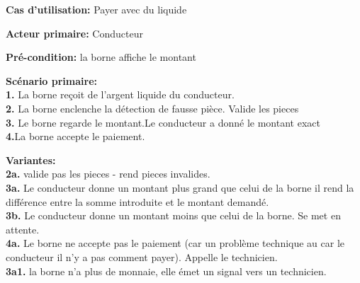 \textbf{Cas d'utilisation:} Payer avec du liquide

\textbf{Acteur primaire:} Conducteur


\textbf{Pré-condition: } la borne affiche le montant
 

\textbf{Scénario primaire: } \\
    \textbf{1.} La borne reçoit de l’argent liquide du conducteur.\\
    \textbf{2.} La borne enclenche la détection de fausse pièce. Valide les pieces\\
    \textbf{3.} Le borne regarde le montant.Le conducteur a donné le montant exact\\
    \textbf{4.}La borne accepte le paiement.

\textbf{Variantes:}\\
    \textbf{2a.} valide pas les pieces - rend pieces invalides.\\
    \textbf{3a.} Le conducteur donne un montant plus grand que celui de la borne il rend la différence entre la somme introduite et le montant demandé. \\
    \textbf{3b.} Le conducteur donne un montant moins que celui de la borne. Se met en attente.\\
    \textbf{4a.} Le borne ne accepte pas le paiement (car un problème technique au car le conducteur il n'y a pas comment payer). Appelle le technicien. \\
    \textbf{3a1.} la borne n’a plus de monnaie, elle émet un signal vers un technicien.\\


